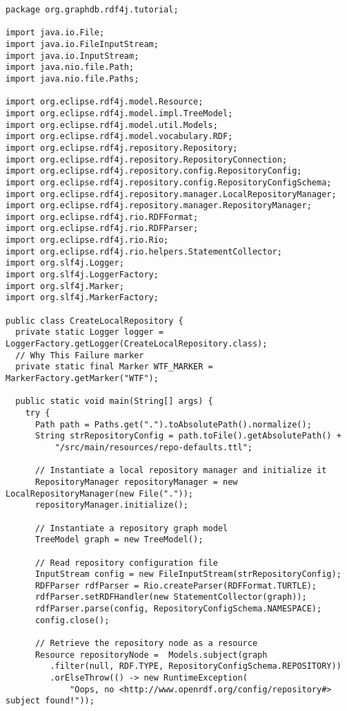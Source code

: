 \documentclass{amsart}
\begin{document}
  \begin{small}
  \begin{verbatim}
package org.graphdb.rdf4j.tutorial;

import java.io.File;
import java.io.FileInputStream;
import java.io.InputStream;
import java.nio.file.Path;
import java.nio.file.Paths;

import org.eclipse.rdf4j.model.Resource;
import org.eclipse.rdf4j.model.impl.TreeModel;
import org.eclipse.rdf4j.model.util.Models;
import org.eclipse.rdf4j.model.vocabulary.RDF;
import org.eclipse.rdf4j.repository.Repository;
import org.eclipse.rdf4j.repository.RepositoryConnection;
import org.eclipse.rdf4j.repository.config.RepositoryConfig;
import org.eclipse.rdf4j.repository.config.RepositoryConfigSchema;
import org.eclipse.rdf4j.repository.manager.LocalRepositoryManager;
import org.eclipse.rdf4j.repository.manager.RepositoryManager;
import org.eclipse.rdf4j.rio.RDFFormat;
import org.eclipse.rdf4j.rio.RDFParser;
import org.eclipse.rdf4j.rio.Rio;
import org.eclipse.rdf4j.rio.helpers.StatementCollector;
import org.slf4j.Logger;
import org.slf4j.LoggerFactory;
import org.slf4j.Marker;
import org.slf4j.MarkerFactory;

public class CreateLocalRepository {
  private static Logger logger = LoggerFactory.getLogger(CreateLocalRepository.class);
  // Why This Failure marker
  private static final Marker WTF_MARKER = MarkerFactory.getMarker("WTF");
	
  public static void main(String[] args) {
    try {		
      Path path = Paths.get(".").toAbsolutePath().normalize();
      String strRepositoryConfig = path.toFile().getAbsolutePath() + 
          "/src/main/resources/repo-defaults.ttl";
		
      // Instantiate a local repository manager and initialize it
      RepositoryManager repositoryManager = new LocalRepositoryManager(new File("."));
      repositoryManager.initialize();

      // Instantiate a repository graph model
      TreeModel graph = new TreeModel();

      // Read repository configuration file
      InputStream config = new FileInputStream(strRepositoryConfig);
      RDFParser rdfParser = Rio.createParser(RDFFormat.TURTLE);
      rdfParser.setRDFHandler(new StatementCollector(graph));
      rdfParser.parse(config, RepositoryConfigSchema.NAMESPACE);
      config.close();

      // Retrieve the repository node as a resource
      Resource repositoryNode =  Models.subject(graph
         .filter(null, RDF.TYPE, RepositoryConfigSchema.REPOSITORY))
         .orElseThrow(() -> new RuntimeException(
             "Oops, no <http://www.openrdf.org/config/repository#> subject found!"));


\end{verbatim}
\end{small}
\end{document}
